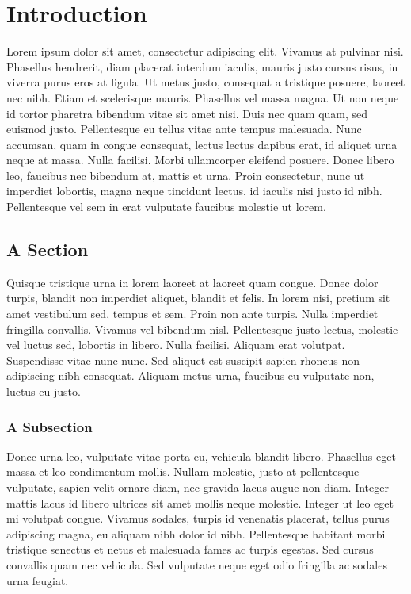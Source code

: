 \chapter{Introduction}

\cite{Reference1}\cite{Reference2}\cite{Reference3}Lorem ipsum dolor sit amet, consectetur adipiscing elit. Vivamus at pulvinar nisi. Phasellus hendrerit, diam placerat interdum iaculis, mauris justo cursus risus, in viverra purus eros at ligula. Ut metus justo, consequat a tristique posuere, laoreet nec nibh. Etiam et scelerisque mauris. Phasellus vel massa magna. Ut non neque id tortor pharetra bibendum vitae sit amet nisi. Duis nec quam quam, sed euismod justo. Pellentesque eu tellus vitae ante tempus malesuada. Nunc accumsan, quam in congue consequat, lectus lectus dapibus erat, id aliquet urna neque at massa. Nulla facilisi. Morbi ullamcorper eleifend posuere. Donec libero leo, faucibus nec bibendum at, mattis et urna. Proin consectetur, nunc ut imperdiet lobortis, magna neque tincidunt lectus, id iaculis nisi justo id nibh. Pellentesque vel sem in erat vulputate faucibus molestie ut lorem.

\section{A Section}

Quisque tristique urna in lorem laoreet at laoreet quam congue. Donec dolor turpis, blandit non imperdiet aliquet, blandit et felis. In lorem nisi, pretium sit amet vestibulum sed, tempus et sem. Proin non ante turpis. Nulla imperdiet fringilla convallis. Vivamus vel bibendum nisl. Pellentesque justo lectus, molestie vel luctus sed, lobortis in libero. Nulla facilisi. Aliquam erat volutpat. Suspendisse vitae nunc nunc. Sed aliquet est suscipit sapien rhoncus non adipiscing nibh consequat. Aliquam metus urna, faucibus eu vulputate non, luctus eu justo.

\subsection{A Subsection}

Donec urna leo, vulputate vitae porta eu, vehicula blandit libero. Phasellus eget massa et leo condimentum mollis. Nullam molestie, justo at pellentesque vulputate, sapien velit ornare diam, nec gravida lacus augue non diam. Integer mattis lacus id libero ultrices sit amet mollis neque molestie. Integer ut leo eget mi volutpat congue. Vivamus sodales, turpis id venenatis placerat, tellus purus adipiscing magna, eu aliquam nibh dolor id nibh. Pellentesque habitant morbi tristique senectus et netus et malesuada fames ac turpis egestas. Sed cursus convallis quam nec vehicula. Sed vulputate neque eget odio fringilla ac sodales urna feugiat.

